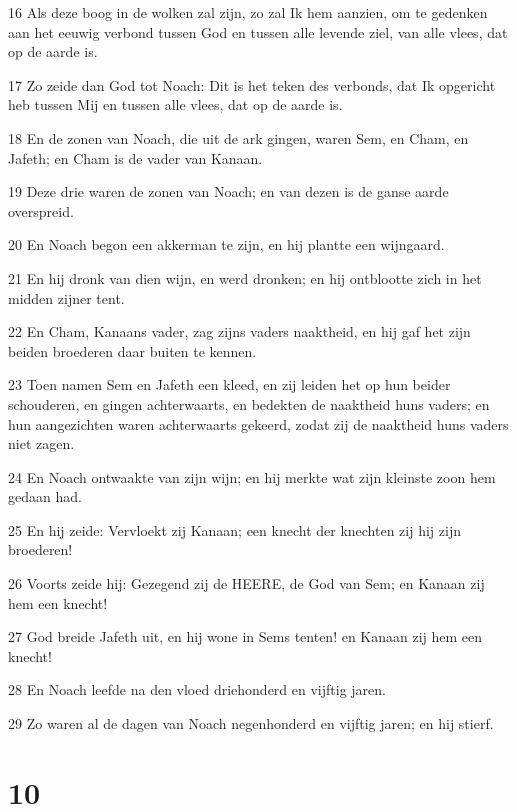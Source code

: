 \par 16 Als deze boog in de wolken zal zijn, zo zal Ik hem aanzien, om te gedenken aan het eeuwig verbond tussen God en tussen alle levende ziel, van alle vlees, dat op de aarde is.
\par 17 Zo zeide dan God tot Noach: Dit is het teken des verbonds, dat Ik opgericht heb tussen Mij en tussen alle vlees, dat op de aarde is.
\par 18 En de zonen van Noach, die uit de ark gingen, waren Sem, en Cham, en Jafeth; en Cham is de vader van Kanaan.
\par 19 Deze drie waren de zonen van Noach; en van dezen is de ganse aarde overspreid.
\par 20 En Noach begon een akkerman te zijn, en hij plantte een wijngaard.
\par 21 En hij dronk van dien wijn, en werd dronken; en hij ontblootte zich in het midden zijner tent.
\par 22 En Cham, Kanaans vader, zag zijns vaders naaktheid, en hij gaf het zijn beiden broederen daar buiten te kennen.
\par 23 Toen namen Sem en Jafeth een kleed, en zij leiden het op hun beider schouderen, en gingen achterwaarts, en bedekten de naaktheid huns vaders; en hun aangezichten waren achterwaarts gekeerd, zodat zij de naaktheid huns vaders niet zagen.
\par 24 En Noach ontwaakte van zijn wijn; en hij merkte wat zijn kleinste zoon hem gedaan had.
\par 25 En hij zeide: Vervloekt zij Kanaan; een knecht der knechten zij hij zijn broederen!
\par 26 Voorts zeide hij: Gezegend zij de HEERE, de God van Sem; en Kanaan zij hem een knecht!
\par 27 God breide Jafeth uit, en hij wone in Sems tenten! en Kanaan zij hem een knecht!
\par 28 En Noach leefde na den vloed driehonderd en vijftig jaren.
\par 29 Zo waren al de dagen van Noach negenhonderd en vijftig jaren; en hij stierf.

\chapter{10}


